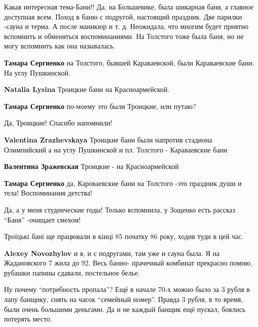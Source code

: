 \begin{itemize}

Какая интересная тема-Бани!! Да, на Большевике, была шикарная баня, а главное
доступная всем. Поход в баню с подругой, настоящий праздник. Две парилки -сауна и
терма. А после маникюр и т. д. Неожидала, что многим будет приятно вспомнить и
обменяться воспоминаниями. На Толстого тоже была баня, но не могу вспомнить как
она называлась.

\begin{itemize} %
\textbf{Тамара Сергиенко} на Толстого, бывшей Караваевской, были Караваевские бани. На углу Пушкинской.

\textbf{Natalia Lysina} Троицкие бани на Красноармейской.

\textbf{Тамара Сергиенко} по-моему это были Троицкие, или путаю?

Да, Троицкие! Спасибо напомнили!

\textbf{Valentina Zrazhevskaya} Троицкие бани были напротив стадиона Олимпийский а на углу Пушкинской и пл. Толстого - Караваевские бани

\textbf{Валентина Зражевская} Троицкие - на Красноармейской

\textbf{Тамара Сергиенко} да, Кароваевские бани на Толстого -это праздник души и тела! Воспоминания детства!

Да, а у меня студенческие годы! Только вспомнила, у Зощенко есть рассказ \enquote{Баня} -очищает смехом!
\end{itemize} %


Троїцькі бані ще працювали в кінці 85 початку 86 року, ходив туди в цей час.

\begin{itemize} %
\textbf{Alexey Novozhylov} и я, и с подругами, там уже и сауна была. Я на Жадановского 7 жила до 92. Весь банно- прачечный комбинат прекрасно помню, рубашки папины сдавали, постельное белье.
\end{itemize} %


Ну почему \enquote{потребность пропала}? Ещё в начале 70-х можно было за 3 рубля в лапу
банщику, снять на часок \enquote{семейный номер}. Правда 3 рубля, в то время, были
очень большими деньгами. Да и не каждый банщик ещё пускал, боялись потерять
место.


\end{itemize}
